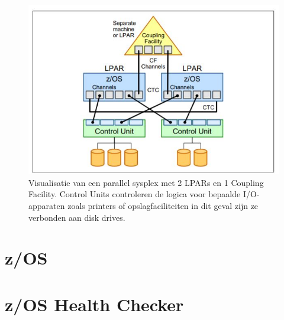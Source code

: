 \begin{figure}[h]
	\centering
	\includegraphics{img/ParallelSysplex}
	\caption[Visualisatie van een Parallel Sysplex]{Visualisatie van een parallel sysplex met 2 LPARs en 1 Coupling Facility. Control Units controleren de logica voor bepaalde I/O-apparaten zoals printers of opslagfaciliteiten in dit geval zijn ze verbonden aan disk drives.}
	\label{fig:parallelsysplex}
\end{figure}


\section{z/OS}
\label{subsec:z/OS}

\section{z/OS Health Checker}
\label{sec:z/OS Health Checker}



